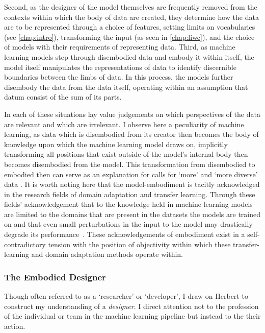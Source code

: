 Second, as the designer of the model themselves are frequently removed from the contexts within which the body of data are created, they determine how the data are to be represented through a choice of features, setting limits on vocabularies (see \autoref{chap:intro}), transforming the input (as seen in \autoref{chap:liwc}), and the choice of models with their requirements of representing data.
Third, as machine learning models step through disembodied data and embody it within itself, the model itself manipulates the representations of data to identify discernible boundaries between the limbs of data. In this process, the models further disembody the data from the data itself, operating within an assumption that datum consist of the sum of its parts.

In each of these situations lay value judgements on which perspectives of the data are relevant and which are irrelevant. I observe here a peculiarity of machine learning, as data which is disembodied from its creator then becomes the body of knowledge upon which the machine learning model draws on, implicitly transforming all positions that exist outside of the model's internal body then becomes disembodied from the model. This transformation from disembodied to embodied then can serve as an explanation for calls for `more' and `more diverse' data \citep{Holstein:2019}.
It is worth noting here that the model-embodiment is tacitly acknowledged in the research fields of domain adaptation \citep{Daume:2007} and transfer learning. Through these fields' acknowledgement that to the knowledge held in machine learning models are limited to the domains that are present in the datasets the models are trained on and that even small perturbations in the input to the model may drastically degrade its performance~\citep{Szegedy:2014,Daume:2007}. These acknowledgements of embodiment exist in a self-contradictory tension with the position of objectivity within which these transfer-learning and domain adaptation methods operate within.

\subsubsection{The Embodied Designer}

Though often referred to as a `researcher' or `developer', I draw on Herbert \citet{Simon:1969} to construct my understanding of a \textit{designer}. I direct attention not to the profession of the individual or team in the machine learning pipeline but instead to the their action.

